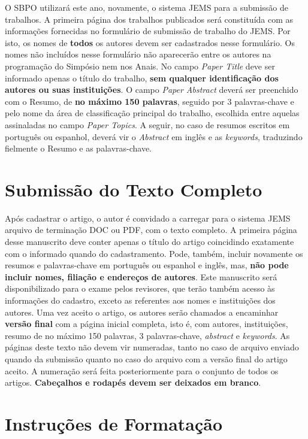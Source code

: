 \documentclass[11pt]{article}
\begin{document}
O SBPO utilizará este ano, novamente, o sistema JEMS para a submissão de trabalhos. A primeira página dos trabalhos publicados será constituída com as informações fornecidas no formulário de submissão de trabalho do JEMS. Por isto, os nomes de \textbf{todos} os autores devem ser cadastrados nesse formulário. Os nomes  não incluídos nesse formulário não aparecerão entre os autores na programação do Simpósio nem nos Anais.
No campo \textit{Paper Title }deve ser informado apenas o título do trabalho, \textbf{sem qualquer identificação dos autores ou suas instituições}. 
O campo \textit{Paper Abstract} deverá ser preenchido com o Resumo, de \textbf{no máximo 150 palavras}, seguido por 3 palavras-chave e pelo nome da área de classificação principal do trabalho, escolhida entre aquelas assinaladas no campo \textit{Paper Topics}. A seguir, no caso de resumos escritos em português ou espanhol, deverá vir o \textit{Abstract} em inglês e as \textit{keywords}, traduzindo fielmente o Resumo e as palavras-chave. 


\section{Submissão do Texto Completo}

Após cadastrar o artigo, o autor é convidado a carregar para o sistema JEMS arquivo de terminação DOC ou PDF, com o texto completo. A primeira página desse manuscrito deve conter apenas o título do artigo coincidindo exatamente com o informado quando do cadastramento. Pode, também, incluir novamente os resumos e palavras-chave em português ou espanhol e inglês, mas, \textbf{não pode incluir nomes, filiação e endereços de autores}.
Este manuscrito será disponibilizado para o exame pelos revisores, que terão também acesso às informações do cadastro, exceto as referentes aos nomes e instituições dos autores. Uma vez aceito o artigo, os autores serão chamados a encaminhar \textbf{versão final} com a página inicial completa, isto é, com autores, instituições, resumo de no máximo 150 palavras, 3 palavras-chave, \textit{abstract} e \textit{keywords}.
As páginas deste texto não devem vir numeradas, tanto no caso de arquivo enviado quando da submissão quanto no caso do arquivo com a versão final do artigo aceito. A numeração será feita posteriormente para o conjunto de todos os artigos. \textbf{Cabeçalhos e rodapés devem ser deixados em branco}.


\section{Instruções de Formatação}
\end{document}
